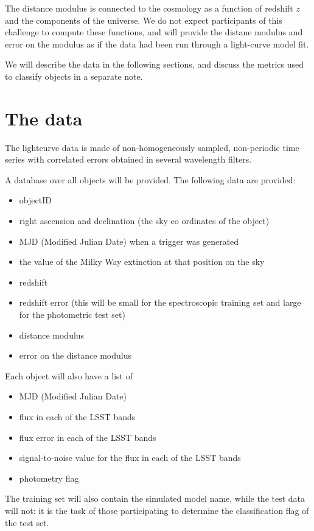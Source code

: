 \documentclass[\docopts]{\docclass}
\begin{document}
The distance modulus is connected to the cosmology as a function of redshift $z$ and the components of the universe. We do not expect participants of this challenge to compute these functions, and will provide the distane modulus and error on the modulus as if the data had been run through a light-curve model fit.

We will describe the data in the following sections, and discuss the metrics used to classify objects in a separate note.
\section{The data}
\label{sec:thedata}
The lightcurve data is made of non-homogeneously sampled, non-periodic time series with correlated errors obtained in several wavelength filters.

A database over all objects will be provided. The following data are provided:

\begin{itemize}
\item objectID
\item right ascension and declination (the sky co ordinates of the object)
\item MJD (Modified Julian Date) when a trigger was generated
\item the value of the Milky Way extinction at that position on the sky
\item redshift
\item redshift error (this will be small for the spectroscopic training set and large for the photometric test set)
\item distance modulus
\item error on the distance modulus
\end{itemize}

Each object will also have a list of

\begin{itemize}
\item MJD (Modified Julian Date)
\item flux in each of the LSST bands
\item flux error in each of the LSST bands
\item signal-to-noise value for the flux in each of the LSST bands
\item photometry flag 
\end{itemize}


The training set will also contain the simulated model name, while the test data will not: it is the task of those participating to determine the classification flag of the test set.
\end{document}
